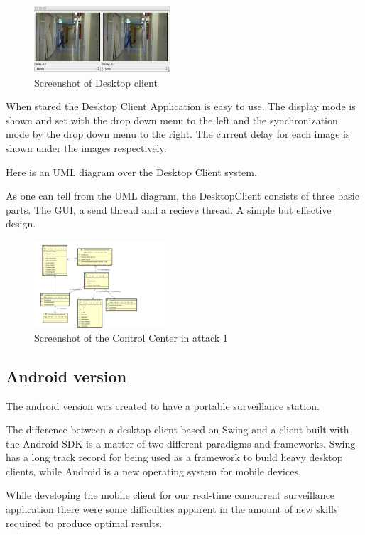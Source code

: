 \documentclass[8pt,titlepage]{article}
\begin{document}
\begin{figure}[hbp]
\includegraphics[width=0.45\textwidth]{../screenshots/desktopclient.png}
\caption{Screenshot of Desktop client}
\label{desktopclient}
\end{figure}

When stared the Desktop Client Application is easy to use. The display mode is shown and set with the drop down menu to the left and the synchronization mode by the drop down menu to the right. The current delay for each image is shown under the images respectively.

Here is an UML diagram over the Desktop Client system. 

As one can tell from the UML diagram, the DesktopClient consists of three basic parts. The GUI, a send thread and a recieve thread. A simple but effective design.

\begin{figure}[hbp]
\includegraphics[width=0.45\textwidth]{../uml/desktop-client.png}
\caption{Screenshot of the Control Center in attack 1}
\end{figure}


\subsection{Android version}
The android version was created to have a portable surveillance station.

The difference between a desktop client based on Swing and a client built with the Android SDK is a matter of two different paradigms and frameworks. Swing has a long track record for being used as a framework to build heavy desktop clients, while Android is a new operating system for mobile devices. 

While developing the mobile client for our real-time concurrent surveillance application there were some difficulties apparent in the amount of new skills required to produce optimal results. 
\end{document}

